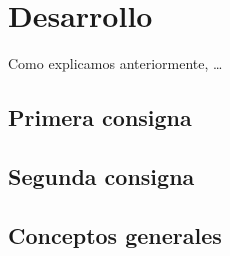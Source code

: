 \section{Desarrollo}

\PARstart Como explicamos anteriormente, \ldots


\subsection{Primera consigna}

\subsection{Segunda consigna}

\subsection{Conceptos generales}

